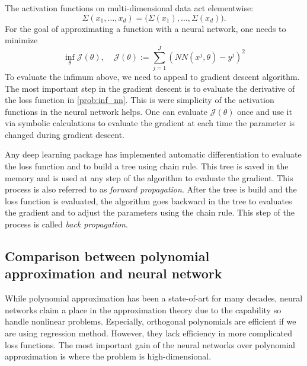 \documentclass[11pt]{book}
\begin{document}
The activation functions on multi-dimensional data act elementwise:
\[
\Sigma(x_1,\dots,x_d)=\big(\Sigma(x_1),\dots,\Sigma(x_d)\big).
\]
For the goal of approximating a function with a neural network, one needs to minimize 
\begin{equation}\label{prob:inf_nn}
    \inf_{\theta}\mathcal{J}(\theta),~~~~~\mathcal{J}(\theta):=\sum_{j=1}^J\left(NN(x^j,\theta)-y^j\right)^2
\end{equation}
To evaluate the infimum above, we need to appeal to gradient descent algorithm. The most important step in the gradient descent is to evaluate the derivative of the loss function in \eqref{prob:inf_nn}. This is were simplicity of the activation functions in the neural network helps. One can evaluate $\mathcal{J}(\theta)$ once and use it via symbolic calculations to evaluate the gradient at each time the parameter is changed during gradient descent. 
\begin{algorithm}
        \caption{Gradient descent algorithm for neural networks}
        \label{alg:gd_nn}
\end{algorithm}
Any deep learning package has implemented automatic differentiation to evaluate the loss function and to build a tree using chain rule. This tree is saved in the memory and is used at any step of the algorithm to evaluate the gradient. This process is also referred to as \emph{forward propagation}. After the tree is build and the loss function is evaluated, the algorithm goes backward in the tree to evaluates the gradient and to adjust the parameters using the chain rule. This step of the process is called \emph{back propagation}.

\subsection{Comparison between polynomial approximation and neural network}
While polynomial approximation has been a state-of-art for many decades, neural networks claim a place in the approximation theory due to the capability so handle nonlinear problems. Especially, orthogonal polynomials are efficient if we are using regression method. However, they lack efficiency in more complicated loss functions. The most important gain of the neural networks over polynomial approximation is where the problem is high-dimensional. 
\end{document}
